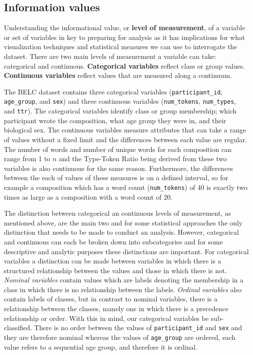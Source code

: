 \documentclass[
  letterpaper,
]{scrbook}
\begin{document}
\hypertarget{information-values}{%
\subsection{Information values}\label{information-values}}

Understanding the informational value, or \textbf{level of measurement},
of a variable or set of variables in key to preparing for analysis as it
has implications for what visualization techniques and statistical
measures we can use to interrogate the dataset. There are two main
levels of measurement a variable can take: categorical and continuous.
\textbf{Categorical variables} reflect class or group values.
\textbf{Continuous variables} reflect values that are measured along a
continuum.

The BELC dataset contains three categorical variables
(\texttt{participant\_id}, \texttt{age\_group}, and \texttt{sex}) and
three continuous variables (\texttt{num\_tokens}, \texttt{num\_types},
and \texttt{ttr}). The categorical variables identify class or group
membership; which participant wrote the composition, what age group they
were in, and their biological sex. The continuous variables measure
attributes that can take a range of values without a fixed limit and the
differences between each value are regular. The number of words and
number of unique words for each composition can range from 1 to \(n\)
and the Type-Token Ratio being derived from these two variables is also
continuous for the same reason. Furthermore, the differences between the
each of values of these measures is on a defined interval, so for
example a composition which has a word count (\texttt{num\_tokens}) of
40 is exactly two times as large as a composition with a word count of
20.

The distinction between categorical an continuous levels of measurement,
as mentioned above, are the main two and for some statistical approaches
the only distinction that needs to be made to conduct an analysis.
However, categorical and continuous can each be broken down into
subcategories and for some descriptive and analytic purposes these
distinctions are important. For categorical variables a distinction can
be made between variables in which there is a structured relationship
between the values and those in which there is not. \emph{Nominal
variables} contain values which are labels denoting the membership in a
class in which there is no relationship between the labels.
\emph{Ordinal variables} also contain labels of classes, but in contrast
to nominal variables, there is a relationship between the classes,
namely one in which there is a precedence relationship or order. With
this in mind, our categorical variables be sub-classified. There is no
order between the values of \texttt{participant\_id} and \texttt{sex}
and they are therefore nominal whereas the values of \texttt{age\_group}
are ordered, each value refers to a sequential age group, and therefore
it is ordinal.
\end{document}
